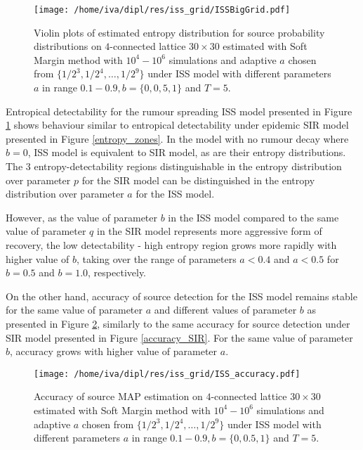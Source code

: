\documentclass[times, utf8, diplomski]{fer}
\begin{document}
\begin{figure}[H]
\center
\texttt{[image: /home/iva/dipl/res/iss\_grid/ISSBigGrid.pdf]}
\caption{Violin plots of estimated entropy distribution for source probability distributions  on $4$-connected lattice $30 \times 30$ estimated with Soft Margin method with $10^4 - 10^6$ simulations and adaptive $a$ chosen from $\{1/2^3, 1/2^4, \ldots, 1/2^{9}\}$ under ISS model with different parameters $a$ in range $0.1-0.9, b = \{0, 0,5, 1 \}$ and $T = 5$.}
\label{ISS_entr}
\end{figure}

Entropical detectability for the rumour spreading ISS model presented in Figure \ref{ISS_entr}  shows behaviour similar to entropical detectability under epidemic SIR model presented in Figure \ref{entropy_zones}. In the model with no rumour decay where $b = 0$, ISS model is equivalent to SIR model, as are their entropy distributions. The $3$ entropy-detectability regions distinguishable in the entropy distribution over parameter $p$ for the SIR model can be distinguished in the entropy distribution over parameter $a$ for the ISS model. 

However, as the value of parameter $b$ in the ISS model compared to the same value of parameter $q$ in the SIR model represents more aggressive form of recovery, the low detectability - high entropy region grows more rapidly with higher value of $b$, taking over the range of parameters $a < 0.4$ and $a < 0.5$ for $b = 0.5$ and $b = 1.0$, respectively. 

On the other hand, accuracy of source detection for the ISS model remains stable for the same value of parameter $a$ and different values of parameter $b$ as presented in Figure \ref{ISS_acc}, similarly to the same accuracy for source detection under SIR model presented in Figure \ref{accuracy_SIR}. For the same value of parameter $b$, accuracy grows with higher value of parameter $a$.

\begin{figure}[H]
\center
\texttt{[image: /home/iva/dipl/res/iss\_grid/ISS\_accuracy.pdf]}
\caption{Accuracy of source MAP estimation on $4$-connected lattice $30 \times 30$ estimated with Soft Margin method with $10^4 - 10^6$ simulations and adaptive $a$ chosen from $\{1/2^3, 1/2^4, \ldots, 1/2^{9}\}$ under ISS model with different parameters $a$ in range $0.1 - 0.9, b = \{0, 0.5, 1\}$ and $T = 5$. }
\label{ISS_acc}
\end{figure}
\end{document}
